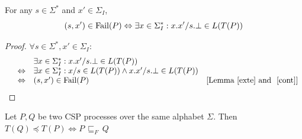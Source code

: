 \begin{lemma}\label{conf}
For any $s\in \Sigma^*$ and $x'\in \Sigma_I$, 
$$(s,   x')\in {\text {\rm Fail}}(P)\Leftrightarrow \exists x\in \Sigma_I^*: x.x'/s.\bot \in L(T(P))$$
\end{lemma}
\begin{proof}
$\forall s\in \Sigma^*, x'\in \Sigma_I$: 
\[\begin{array}{llll}
&& \exists x\in \Sigma_I^*: x.x'/s.\bot\in L(T(P))&\\ 
&\Leftrightarrow & \exists x\in \Sigma_I^*: x/s\in L(T(P))\wedge x.x'/s.\bot\in L(T(P))&\\
&\Leftrightarrow & (s,   x')\in {\text {\rm Fail}}(P)&[{\text {Lemma~\ref{exte} and ~\ref{cont}}}]

\end{array}
\]
\xbox
\end{proof}
\begin{theorem}
Let $P,Q$ be two CSP processes over the same alphabet $\Sigma$. Then\\
$T(Q)\preceq T(P) \Leftrightarrow P\,\sqsubseteq_F\, Q$
\end{theorem}
